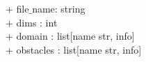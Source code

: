 {
+ file$\_$name: string \\
+ dims : int \\
+ domain : list[name str, info] \\ %
+ obstacles : list[name str, info] %
}
{
}
